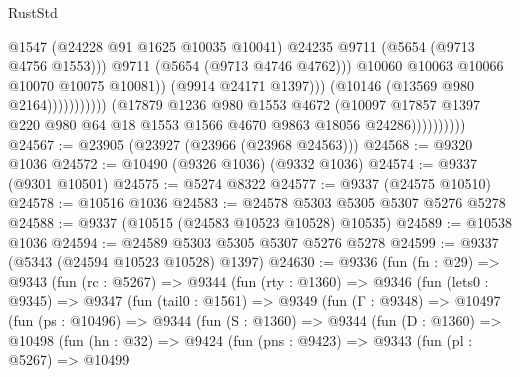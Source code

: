 \begin{lexlean}{RustStd}
\begin{coremodule}
                                                  @1547
                                                  (@24228 @91 @1625 @10035 @10041)
                                                  @24235
                                                  @9711
                                                  (@5654 (@9713 @4756 @1553)))
                                                @9711
                                                (@5654 (@9713 @4746 @4762)))
                                              @10060
                                              @10063
                                              @10066
                                              @10070
                                              @10075
                                              @10081))
                                          (@9914 @24171 @1397)))
                                      (@10146 (@13569 @980 @2164)))))))))))
                    (@17879
                      @1236
                      @980
                      @1553
                      @4672
                      (@10097
                        @17857
                        @1397
                        @220
                        @980
                        @64
                        @18
                        @1553
                        @1566
                        @4670
                        @9863
                        @18056
                        @24286))))))))))
@24567 := @23905 (@23927 (@23966 (@23968 @24563)))
@24568 := @9320 @1036
@24572 := @10490 (@9326 @1036) (@9332 @1036)
@24574 := @9337 (@9301 @10501)
@24575 := @5274 @8322
@24577 := @9337 (@24575 @10510)
@24578 := @10516 @1036
@24583 := @24578 @5303 @5305 @5307 @5276 @5278
@24588 := @9337 (@10515 (@24583 @10523 @10528) @10535)
@24589 := @10538 @1036
@24594 := @24589 @5303 @5305 @5307 @5276 @5278
@24599 := @9337 (@5343 (@24594 @10523 @10528) @1397)
@24630 := @9336
    (fun (fn : @29) =>
    @9343
      (fun (rc : @5267) =>
      @9344
        (fun (rty : @1360) =>
        @9346
          (fun (lets0 : @9345) =>
          @9347
            (fun (tail0 : @1561) =>
            @9349
              (fun (Γ : @9348) =>
              @10497
                (fun (ps : @10496) =>
                @9344
                  (fun (S : @1360) =>
                  @9344
                    (fun (D : @1360) =>
                    @10498
                      (fun (hn : @32) =>
                      @9424
                        (fun (pns : @9423) =>
                        @9343
                          (fun (pl : @5267) =>
                          @10499

\end{coremodule}
\end{lexlean}
